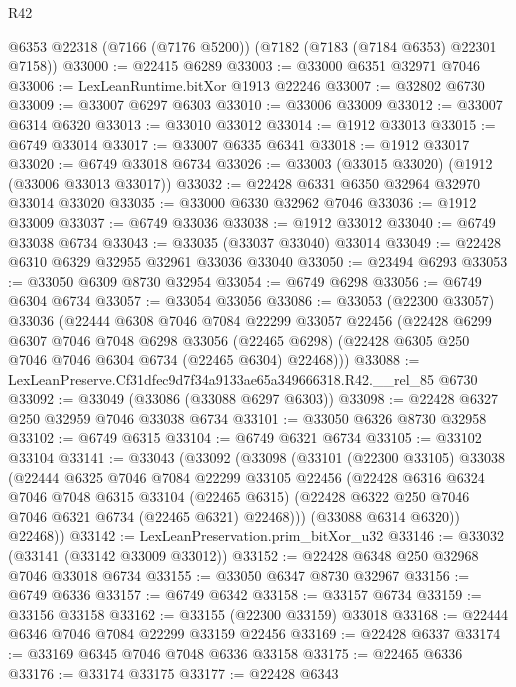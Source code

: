 \begin{lexlean}{R42}
\begin{coremodule}
{    @6353
    @22318
    (@7166 (@7176 @5200))
    (@7182 (@7183 (@7184 @6353) @22301 @7158))
@33000 := @22415 @6289
@33003 := @33000 @6351 @32971 @7046
@33006 := LexLeanRuntime.bitXor @1913 @22246
@33007 := @32802 @6730
@33009 := @33007 @6297 @6303
@33010 := @33006 @33009
@33012 := @33007 @6314 @6320
@33013 := @33010 @33012
@33014 := @1912 @33013
@33015 := @6749 @33014
@33017 := @33007 @6335 @6341
@33018 := @1912 @33017
@33020 := @6749 @33018 @6734
@33026 := @33003 (@33015 @33020) (@1912 (@33006 @33013 @33017))
@33032 := @22428 @6331 @6350 @32964 @32970 @33014 @33020
@33035 := @33000 @6330 @32962 @7046
@33036 := @1912 @33009
@33037 := @6749 @33036
@33038 := @1912 @33012
@33040 := @6749 @33038 @6734
@33043 := @33035 (@33037 @33040) @33014
@33049 := @22428 @6310 @6329 @32955 @32961 @33036 @33040
@33050 := @23494 @6293
@33053 := @33050 @6309 @8730 @32954
@33054 := @6749 @6298
@33056 := @6749 @6304 @6734
@33057 := @33054 @33056
@33086 := @33053
    (@22300 @33057)
    @33036
    (@22444
      @6308
      @7046
      @7084
      @22299
      @33057
      @22456
      (@22428
        @6299
        @6307
        @7046
        @7048
        @6298
        @33056
        (@22465 @6298)
        (@22428 @6305 @250 @7046 @7046 @6304 @6734 (@22465 @6304) @22468)))
@33088 := LexLeanPreserve.Cf31dfec9d7f34a9133ae65a349666318.R42.__rel_85 @6730
@33092 := @33049 (@33086 (@33088 @6297 @6303))
@33098 := @22428 @6327 @250 @32959 @7046 @33038 @6734
@33101 := @33050 @6326 @8730 @32958
@33102 := @6749 @6315
@33104 := @6749 @6321 @6734
@33105 := @33102 @33104
@33141 := @33043
    (@33092
      (@33098
        (@33101
          (@22300 @33105)
          @33038
          (@22444
            @6325
            @7046
            @7084
            @22299
            @33105
            @22456
            (@22428
              @6316
              @6324
              @7046
              @7048
              @6315
              @33104
              (@22465 @6315)
              (@22428 @6322 @250 @7046 @7046 @6321 @6734 (@22465 @6321) @22468)))
          (@33088 @6314 @6320))
        @22468))
@33142 := LexLeanPreservation.prim_bitXor_u32
@33146 := @33032 (@33141 (@33142 @33009 @33012))
@33152 := @22428 @6348 @250 @32968 @7046 @33018 @6734
@33155 := @33050 @6347 @8730 @32967
@33156 := @6749 @6336
@33157 := @6749 @6342
@33158 := @33157 @6734
@33159 := @33156 @33158
@33162 := @33155 (@22300 @33159) @33018
@33168 := @22444 @6346 @7046 @7084 @22299 @33159 @22456
@33169 := @22428 @6337
@33174 := @33169 @6345 @7046 @7048 @6336 @33158
@33175 := @22465 @6336
@33176 := @33174 @33175
@33177 := @22428 @6343
}
\end{coremodule}
\end{lexlean}

